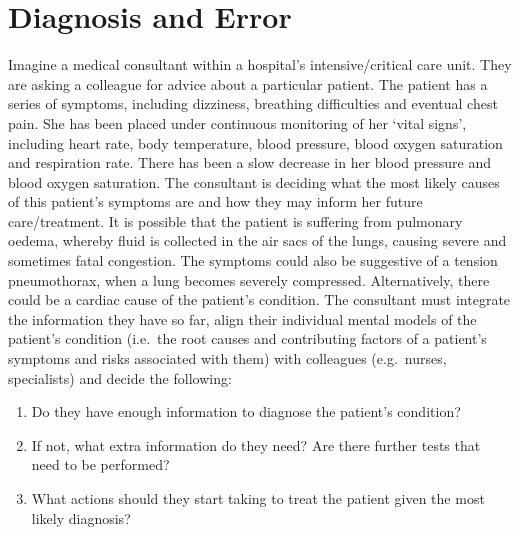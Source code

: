 \documentclass[a4paper, nobind]{templates/ociamthesis}
\providecommand{\tightlist}{%
  \setlength{\itemsep}{0pt}\setlength{\parskip}{0pt}}
\begin{document}
\adjustmtc
{}

\section{Diagnosis and Error}\label{diagnosis-and-error}

Imagine a medical consultant within a hospital's intensive/critical care unit. They are asking a colleague for advice about a particular patient. The patient has a series of symptoms, including dizziness, breathing difficulties and eventual chest pain. She has been placed under continuous monitoring of her `vital signs', including heart rate, body temperature, blood pressure, blood oxygen saturation and respiration rate. There has been a slow decrease in her blood pressure and blood oxygen saturation. The consultant is deciding what the most likely causes of this patient's symptoms are and how they may inform her future care/treatment. It is possible that the patient is suffering from pulmonary oedema, whereby fluid is collected in the air sacs of the lungs, causing severe and sometimes fatal congestion. The symptoms could also be suggestive of a tension pneumothorax, when a lung becomes severely compressed. Alternatively, there could be a cardiac cause of the patient's condition. The consultant must integrate the information they have so far, align their individual mental models of the patient's condition (i.e.~the root causes and contributing factors of a patient's symptoms and risks associated with them) with colleagues (e.g.~nurses, specialists) and decide the following:

\begin{enumerate}
\def\labelenumi{\arabic{enumi}.}
\tightlist
\item
  Do they have enough information to diagnose the patient's condition?
\item
  If not, what extra information do they need? Are there further tests that need to be performed?
\item
  What actions should they start taking to treat the patient given the most likely diagnosis?
\end{enumerate}
\end{document}
